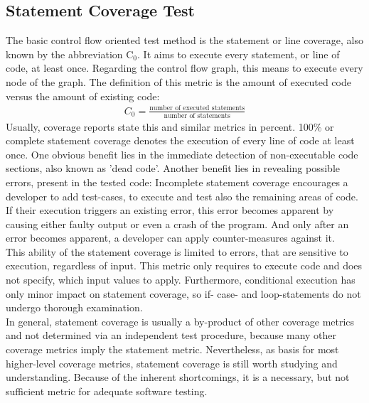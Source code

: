 	\subsection{Statement Coverage Test}
	The basic control flow oriented test method is the statement or line coverage, also known by the abbreviation C$_0$. It aims to execute every statement, or line of code, at least once. Regarding the control flow graph, this means to execute every node of the graph. The definition of this metric is the amount of executed code versus the amount of existing code:
		\begin{align*}
		C_0 = \frac{\textrm{number of executed statements}}{\textrm{number of statements}}
		\end{align*}
	Usually, coverage reports state this and similar metrics in percent. 100\% or complete statement coverage denotes the execution of every line of code at least once. One obvious benefit lies in the immediate detection of non-executable code sections, also known as 'dead code'. Another benefit lies in revealing possible errors, present in the tested code: Incomplete statement coverage encourages a developer to add test-cases, to execute and test also the remaining areas of code. If their execution triggers an existing error, this error becomes apparent by causing either faulty output or even a crash of the program. And only after an error becomes apparent, a developer can apply counter-measures against it. \\
	This ability of the statement coverage is limited to errors, that are sensitive to execution, regardless of input. This metric only requires to execute code and does not specify, which input values to apply. Furthermore, conditional execution has only minor impact on statement coverage, so if- case- and loop-statements do not undergo thorough examination. \\
	In general, statement coverage is usually a by-product of other coverage metrics and not determined via an independent test procedure, because many other coverage metrics imply the statement metric. Nevertheless, as basis for most higher-level coverage metrics, statement coverage is still worth studying and understanding. Because of the inherent shortcomings, it is a necessary, but not sufficient metric for adequate software testing. \\
